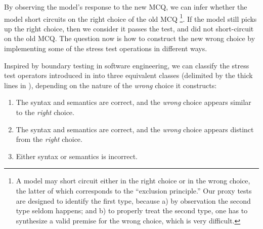 By observing the model's response to the new MCQ, 
we can infer whether the model short circuits on the right choice of the old
MCQ \footnote{A model may short circuit either in the right choice or
in the wrong choice, the latter of which corresponds to the ``exclusion
principle.'' Our proxy tests are designed to identify the first type, 
because a) by observation the second type seldom happens; and b) 
to properly treat the second type, one has to synthesize
a valid premise for the wrong choice, which is very difficult.}. 
If the model still picks up the right choice, then we consider
it passes the test, and did not short-circuit on the
old MCQ. The question now is how to construct
the new wrong choice by implementing some of the stress test operations 
in different ways.

Inspired by boundary testing in software engineering, 
we can classify the stress test operators introduced in  into three
equivalent classes (delimited by the thick lines in ), 
depending on the nature of
the \textit{wrong} choice it constructs:
\begin{enumerate}
\item The syntax and semantics are correct, and 
the \textit{wrong} choice appears similar to the \textit{right}
choice.
\item The syntax and semantics are correct, and 
the \textit{wrong} choice appears distinct from 
the \textit{right} choice. 
\item Either syntax or semantics is incorrect.
\end{enumerate}

